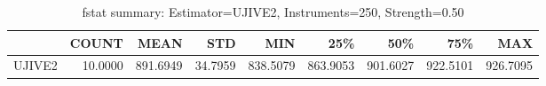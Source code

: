 \begin{table}[ht]
\centering
\caption{fstat summary: Estimator=UJIVE2, Instruments=250, Strength=0.50}
\begin{tabular}{lrrrrrrrr}
\toprule
 & COUNT & MEAN & STD & MIN & 25\% & 50\% & 75\% & MAX \\
\midrule
UJIVE2 & 10.0000 & 891.6949 & 34.7959 & 838.5079 & 863.9053 & 901.6027 & 922.5101 & 926.7095 \\
\bottomrule
\end{tabular}
\end{table}
